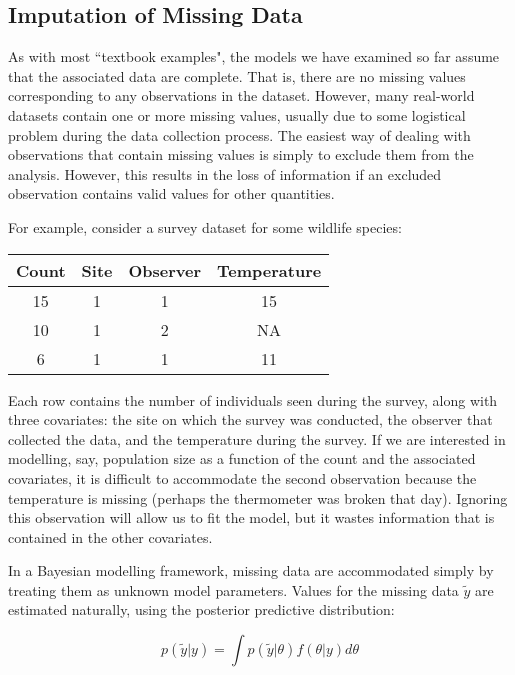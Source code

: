 \hypertarget{missing}{}
\subsection*{Imputation of Missing Data} %

As with most ``textbook examples", the models we have examined so far assume that the associated data are complete. That is, there are no missing values corresponding to any observations in the dataset. However, many real-world datasets contain one or more missing values, usually due to some logistical problem during the data collection process. The easiest way of dealing with observations that contain missing values is simply to exclude them from the analysis. However, this results in the loss of information if an excluded observation contains valid values for other quantities. 

For example, consider a survey dataset for some wildlife species:

\begin{center}
\begin{tabular}{cccc}
\hline
Count & Site & Observer & Temperature\\
\hline
15 & 1 & 1 & 15\\
10 & 1 & 2 & NA\\
6 & 1 & 1 & 11\\
\hline
\end{tabular}
\end{center}

Each row contains the number of individuals seen during the survey, along with three covariates: the site on which the survey was conducted, the observer that collected the data, and the temperature during the survey. If we are interested in modelling, say, population size as a function of the count and the associated covariates, it is difficult to accommodate the second observation because the temperature is missing (perhaps the thermometer was broken that day). Ignoring this observation will allow us to fit the model, but it wastes information that is contained in the other covariates. 

In a Bayesian modelling framework, missing data are accommodated simply by treating them as unknown model parameters. Values for the missing data $\tilde{y}$ are estimated naturally, using the posterior predictive distribution:

\begin{equation}
	p(\tilde{y}|y) = \int p(\tilde{y}|\theta) f(\theta|y) d\theta
\end{equation}

